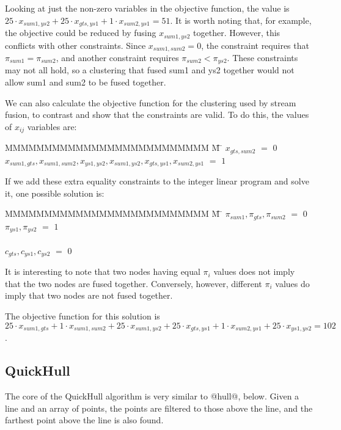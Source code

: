 Looking at just the non-zero variables in the objective function, the value is
$25 \cdot x_{sum1,ys2} + 25 \cdot x_{gts,ys1} + 1 \cdot x_{sum2, ys1} = 51$.
It is worth noting that, for example, the objective could be reduced by fusing $x_{sum1,ys2}$ together.
However, this conflicts with other constraints. Since $x_{sum1, sum2} = 0$, the constraint requires that $\pi_{sum1} = \pi_{sum2}$, and another constraint requires $\pi_{sum2} < \pi_{ys2}$.
These constraints may not all hold, so a clustering that fused sum1 and ys2 together would not allow sum1 and sum2 to be fused together.

We can also calculate the objective function for the clustering used by stream fusion, to contrast and show that the constraints are valid.
To do this, the values of $x_{ij}$ variables are:
\begin{tabbing}
MMMMMMMMMMMMMMMMMMMMMMMMMM \= M \= \kill
$x_{gts, sum2}$
    \> $=$ \> $0$ \\
$x_{sum1, gts}, x_{sum1, sum2}, x_{ys1,  ys2}, x_{sum1, ys2}, x_{gts, ys1 }, x_{sum2, ys1}$
    \> $=$ \> $1$
\end{tabbing}
If we add these extra equality constraints to the integer linear program and solve it, one possible solution is:
\begin{tabbing}
MMMMMMMMMMMMMMMMMMMMMMMMMM \= M \= \kill
$\pi_{sum1}, \pi_{gts }, \pi_{sum2}$
    \> $=$ \> $0$ \\
$\pi_{ys1 }, \pi_{ys2 }$
    \> $=$ \> $1$ \\
\\
$c_{gts}, c_{ys1}, c_{ys2}$           
    \> $=$ \> $0$
\end{tabbing}
It is interesting to note that two nodes having equal $\pi_i$ values does not imply that the two nodes are fused together.
Conversely, however, different $\pi_i$ values do imply that two nodes are not fused together.

The objective function for this solution is
$25 \cdot x_{sum1, gts} + 1 \cdot x_{sum1,sum2} + 25 \cdot x_{sum1, ys2} + 25 \cdot x_{gts, ys1} + 1 \cdot x_{sum2, ys1} + 25 \cdot x_{ys1, ys2} = 102$.

\subsection{QuickHull}
The core of the QuickHull algorithm is very similar to @hull@, below.
Given a line and an array of points, the points are filtered to those above the line,
and the farthest point above the line is also found.

